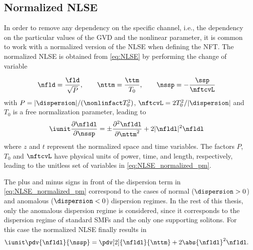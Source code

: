 \subsection{Normalized \acl{NLSE}}\label{sec:NLSE_normalization}

In order to remove any dependency on the specific channel, i.e.,  the dependency
on the particular values of the \ac{GVD} and the nonlinear parameter, it is common to work
with a normalized version of  the \ac{NLSE} when defining the \ac{NFT}. The
normalized \ac{NLSE} is obtained from \eqref{eq:NLSE} by performing the change
of variable

\begin{equation}\label{eq:change_of_variables_NLSE}
  \nfld = \dfrac{\fld}{\sqrt{P}},
  \hspace{0.7cm} \nttm = \dfrac{\ttm}{T_0},
  \hspace{0.7cm} \nssp = - \dfrac{\ssp}{\nftcvL}
\end{equation}
with $P = |\dispersion|/(\nonlinfact T_0^2)$, $\nftcvL = 2 T_0^2 /|\dispersion|$ and $T_0$ is a free normalization parameter, leading to
\begin{equation}\label{eq:NLSE_normalized_pm}
  \iunit \frac{\partial \nfldl}{\partial \nssp} =
  \pm \frac{\partial^2 \nfldl}{\partial \nttm^2}
  + 2 |\nfldl|^2 \nfldl
\end{equation}
where $z$ and $t$ represent the normalized space and time variables.
The factors $P$, $T_0$ and $\nftcvL$  have physical units of power, time, and
length, respectively, leading to the unitless set of variables in
\eqref{eq:NLSE_normalized_pm}.

The plus and minus signs  in front of the dispersion term in \eqref{eq:NLSE_normalized_pm} correspond to the cases
of normal ($\dispersion>0$) and anomalous ($\dispersion<0$) dispersion regimes.
In the rest of this thesis, only the anomalous dispersion regime is
considered, since it corresponds to the dispersion regime of standard \acp{SMF} and the only one supporting solitons. For this case the normalized
\ac{NLSE} finally results in
\begin{equation}\label{eq:NLSE_normalized}
  \iunit \pdv{\nfldl}{\nssp} = \pdv[2]{\nfldl}{\nttm}
                             + 2 \abs{\nfldl}^2 \nfldl.
\end{equation}

